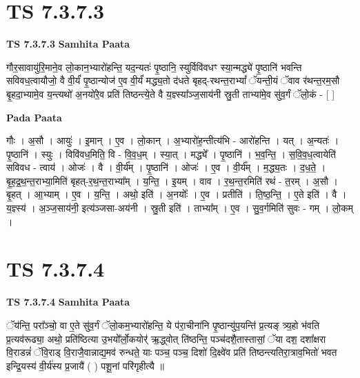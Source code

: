 \documentclass[17pt]{extarticle}
\begin{document}
\section*{ TS 7.3.7.3 }

\textbf{TS 7.3.7.3 } \newline
\textbf{Samhita Paata} \newline

गौर॒सावायु॑रि॒माने॒व लो॒कान॒भ्यारो॑हन्ति॒ यद॒न्यतः॑ पृ॒ष्ठानि॒ स्युर्विवि॑वधꣳ स्या॒न्मद्ध्ये॑ पृ॒ष्ठानि॑ भवन्ति सविवध॒त्वायौजो॒ वै वी॒र्यं॑ पृ॒ष्ठान्योज॑ ए॒व वी॒र्यं॑ मद्ध्य॒तो द॑धते बृहद्-रथन्त॒राभ्यां᳚ ॅयन्ती॒यं ॅवाव र॑थन्त॒रम॒सौ बृ॒हदा॒भ्यामे॒व य॒न्त्यथो॑ अ॒नयो॑रे॒व प्रति॑ तिष्ठन्त्ये॒ते वै य॒ज्ञ्स्या᳚ञ्ज॒साय॑नी स्रु॒ती ताभ्या॑मे॒व सु॑व॒र्गं ॅलो॒कं - [  ] \newline

\textbf{Pada Paata} \newline

गौः । अ॒सौ । आयुः॑ । इ॒मान् । ए॒व । लो॒कान् । अ॒भ्यारो॑ह॒न्तीत्य॑भि - आरो॑हन्ति । यत् । अ॒न्यतः॑ । पृ॒ष्ठानि॑ । स्युः । विवि॑वध॒मिति॒ वि - वि॒व॒ध॒म् । स्या॒त् । मद्ध्ये᳚ । पृ॒ष्ठानि॑ । भ॒व॒न्ति॒ । स॒वि॒व॒ध॒त्वायेति॑ सविवध - त्वाय॑ । ओजः॑ । वै । वी॒र्य᳚म् । पृ॒ष्ठानि॑ । ओजः॑ । ए॒व । वी॒र्य᳚म् । म॒द्ध्य॒तः । द॒ध॒ते॒ । बृ॒ह॒द्र॒थ॒न्त॒राभ्या॒मिति॑ बृहत्-र॒थ॒न्त॒राभ्या᳚म् । य॒न्ति॒ । इ॒यम् । वाव । र॒थ॒न्त॒रमिति॑ रथं - त॒रम् । अ॒सौ । बृ॒हत् । आ॒भ्याम् । ए॒व । य॒न्ति॒ । अथो॒ इति॑ । अ॒नयोः᳚ । ए॒व । प्रतीति॑ । ति॒ष्ठ॒न्ति॒ । ए॒ते इति॑ । वै । य॒ज्ञ्स्य॑ । अ॒ञ्ज॒साय॑नी॒ इत्य॑ञ्जसा-अय॑नी । स्रु॒ती इति॑ । ताभ्या᳚म् । ए॒व । सु॒व॒र्गमिति॑ सुवः - गम् । लो॒कम् ।  \newline




\section*{ TS 7.3.7.4 }

\textbf{TS 7.3.7.4 } \newline
\textbf{Samhita Paata} \newline

ॅय॑न्ति॒ परा᳚ञ्चो॒ वा ए॒ते सु॑व॒र्गं ॅलो॒कम॒भ्यारो॑हन्ति॒ ये प॑रा॒चीना॑नि पृ॒ष्ठान्यु॑प॒यन्ति॑ प्र॒त्यङ् त्र्य॒हो भ॑वति प्र॒त्यव॑रूढ्या॒ अथो॒ प्रति॑ष्ठित्या उ॒भयो᳚र्लो॒कयोर्॑ ऋ॒द्ध्वोत् ति॑ष्ठन्ति॒ पञ्च॑दशै॒तास्तासां॒ ॅया दश॒ दशा᳚क्षरा वि॒राडन्नं॑ ॅवि॒राड् वि॒राजै॒वान्नाद्य॒मव॑ रुन्धते॒ याः पञ्च॒ पञ्च॒ दिशो॑ दि॒क्ष्वे॑व प्रति॑ तिष्ठन्त्यतिरा॒त्राव॒भितो॑ भवत इन्द्रि॒यस्य॑ वी॒र्य॑स्य प्र॒जायै॑ ( ) पशू॒नां परि॑गृहीत्यै ॥ \newline
\end{document}

